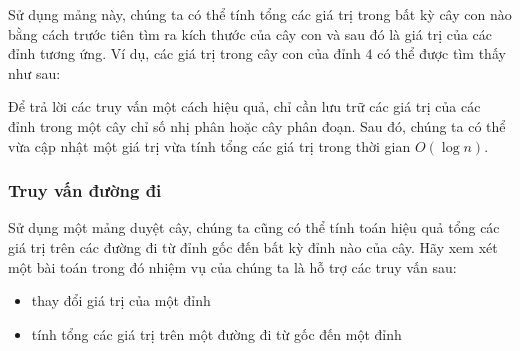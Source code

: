 Sử dụng mảng này, chúng ta có thể tính tổng các giá trị
trong bất kỳ cây con nào bằng cách trước tiên tìm ra kích thước của cây con
và sau đó là giá trị của các đỉnh tương ứng.
Ví dụ, các giá trị trong cây con của đỉnh $4$
có thể được tìm thấy như sau:

\begin{center}
\end{center}

Để trả lời các truy vấn một cách hiệu quả,
chỉ cần lưu trữ các giá trị của các
đỉnh trong một cây chỉ số nhị phân hoặc cây phân đoạn.
Sau đó, chúng ta có thể vừa cập nhật một giá trị
vừa tính tổng các giá trị trong thời gian $O(\log n)$.

\subsubsection{Truy vấn đường đi}

Sử dụng một mảng duyệt cây, chúng ta cũng có thể tính toán hiệu quả
tổng các giá trị trên
các đường đi từ đỉnh gốc đến bất kỳ
đỉnh nào của cây.
Hãy xem xét một bài toán trong đó nhiệm vụ của chúng ta
là hỗ trợ các truy vấn sau:
\begin{itemize}
\item thay đổi giá trị của một đỉnh
\item tính tổng các giá trị trên một đường đi từ
gốc đến một đỉnh
\end{itemize}

